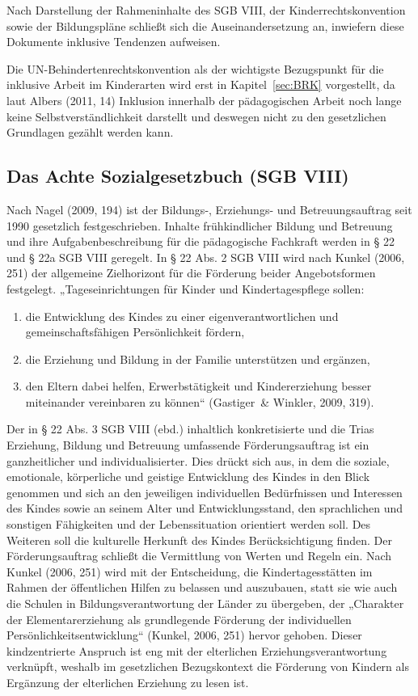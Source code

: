 Nach Darstellung der Rahmeninhalte des SGB VIII, der Kinderrechtskonvention sowie der Bildungspläne schließt sich die Auseinandersetzung an, inwiefern diese Dokumente inklusive Tendenzen aufweisen. 

Die UN-Behindertenrechtskonvention als der wichtigste Bezugspunkt für die inklusive Arbeit im Kinderarten wird erst in Kapitel~\ref{sec:BRK} vorgestellt, da laut Albers (2011, 14) Inklusion innerhalb der pädagogischen Arbeit noch lange keine Selbstverständlichkeit darstellt und deswegen nicht zu den gesetzlichen Grundlagen gezählt werden kann. 

\subsection{Das Achte Sozialgesetzbuch (SGB VIII)}\label{kap:AchtesSGB}

Nach Nagel (2009, 194) ist der Bildungs-, Erziehungs- und Betreuungsauftrag seit 1990 gesetzlich festgeschrieben. Inhalte frühkindlicher Bildung und Betreuung und ihre Aufgabenbeschreibung für die pädagogische Fachkraft werden in § 22 und § 22a SGB VIII geregelt. 
In § 22 Abs. 2 SGB VIII wird nach Kunkel (2006, 251) der allgemeine Zielhorizont für die Förderung beider Angebotsformen festgelegt. 
„Tageseinrichtungen für Kinder und Kindertagespflege sollen:

\begin{enumerate}
\item die Entwicklung des Kindes zu einer eigenverantwortlichen und gemeinschaftsfähigen Persönlichkeit fördern,
\item die Erziehung und Bildung in der Familie unterstützen und ergänzen,
\item den Eltern dabei helfen, Erwerbstätigkeit und Kindererziehung besser miteinander vereinbaren zu können“ (Gastiger~\& Winkler, 2009, 319).  
\end{enumerate}

Der in § 22 Abs. 3 SGB VIII (ebd.) inhaltlich konkretisierte und die Trias Erziehung, Bildung und Betreuung umfassende Förderungsauftrag ist ein ganzheitlicher und individualisierter. Dies drückt sich aus, in dem die soziale, emotionale, körperliche und geistige Entwicklung des Kindes in den Blick genommen und sich an den jeweiligen individuellen Bedürfnissen und Interessen des Kindes sowie an seinem Alter und Entwicklungsstand, den sprachlichen und sonstigen Fähigkeiten und der Lebenssituation orientiert werden soll. Des Weiteren soll die kulturelle Herkunft des Kindes Berücksichtigung finden. Der Förderungsauftrag schließt die Vermittlung von Werten und Regeln ein. Nach Kunkel (2006, 251) wird mit der Entscheidung, die Kindertagesstätten im Rahmen der öffentlichen Hilfen zu belassen und auszubauen, statt sie wie auch die Schulen in Bildungsverantwortung der Länder zu übergeben, der „Charakter der Elementarerziehung als grundlegende Förderung der individuellen Persönlichkeitsentwicklung“ (Kunkel, 2006, 251) hervor gehoben. Dieser kindzentrierte Anspruch ist eng mit der elterlichen Erziehungsverantwortung verknüpft, weshalb im gesetzlichen Bezugskontext die Förderung von Kindern als Ergänzung der elterlichen Erziehung zu lesen ist. 

